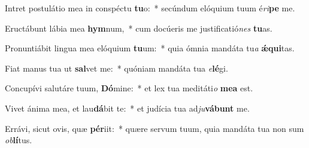 \item Intret postulátio mea in conspéctu \textbf{tu}o:~* secúndum elóquium tuum é\textit{ri}\textbf{pe} me.
\item Eructábunt lábia mea \textbf{hym}num,~* cum docúeris me justificatió\textit{nes} \textbf{tu}as.
\item Pronuntiábit lingua mea elóquium \textbf{tu}um:~* quia ómnia mandáta tu\textit{a} \textbf{ǽ}\textbf{qui}tas.
\item Fiat manus tua ut \textbf{sal}vet me:~* quóniam mandáta tua \textit{e}\textbf{lé}gi.
\item Concupívi salutáre tuum, \textbf{Dó}mine:~* et lex tua meditáti\textit{o} \textbf{me}\textbf{a} est.
\item Vivet ánima mea, et lau\textbf{dá}bit te:~* et judícia tua ad\textit{ju}\textbf{vá}\textbf{bunt} me.
\item Errávi, sicut ovis, quæ \textbf{pér}iit:~* quære servum tuum, quia mandáta tua non sum \textit{ob}\textbf{lí}tus.
